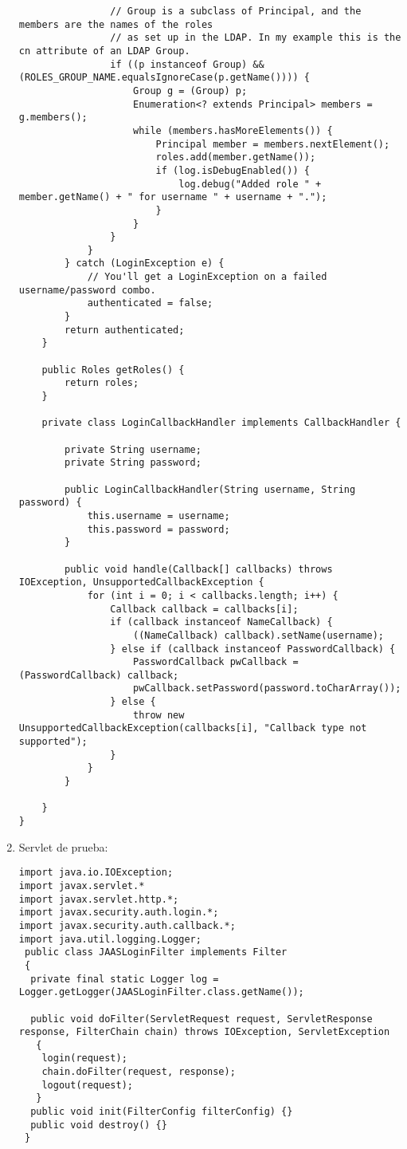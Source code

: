 \begin{enumerate}
\begin{lstlisting}
				// Group is a subclass of Principal, and the members are the names of the roles
				// as set up in the LDAP. In my example this is the cn attribute of an LDAP Group.
				if ((p instanceof Group) && (ROLES_GROUP_NAME.equalsIgnoreCase(p.getName()))) {
					Group g = (Group) p;
					Enumeration<? extends Principal> members = g.members();
					while (members.hasMoreElements()) {
						Principal member = members.nextElement();
						roles.add(member.getName());
						if (log.isDebugEnabled()) {
							log.debug("Added role " + member.getName() + " for username " + username + ".");
						}
					}
				}
			}
		} catch (LoginException e) {
			// You'll get a LoginException on a failed username/password combo.
			authenticated = false;
		}
        return authenticated;
    }

    public Roles getRoles() {
        return roles;
    }

    private class LoginCallbackHandler implements CallbackHandler {

    	private String username;
    	private String password;
    	
    	public LoginCallbackHandler(String username, String password) {
    		this.username = username;
    		this.password = password;
    	}
    	
		public void handle(Callback[] callbacks) throws IOException, UnsupportedCallbackException {
	    	for (int i = 0; i < callbacks.length; i++) {
				Callback callback = callbacks[i];
				if (callback instanceof NameCallback) {
					((NameCallback) callback).setName(username);
				} else if (callback instanceof PasswordCallback) {
					PasswordCallback pwCallback = (PasswordCallback) callback;
					pwCallback.setPassword(password.toCharArray());
				} else {
					throw new UnsupportedCallbackException(callbacks[i], "Callback type not supported");
				}
			}
		}
    	
    }
}
\end{lstlisting}
		\item Servlet de prueba:
\begin{lstlisting}
import java.io.IOException;
import javax.servlet.*
import javax.servlet.http.*;
import javax.security.auth.login.*;
import javax.security.auth.callback.*;
import java.util.logging.Logger;
 public class JAASLoginFilter implements Filter
 {
  private final static Logger log = Logger.getLogger(JAASLoginFilter.class.getName());
   
  public void doFilter(ServletRequest request, ServletResponse response, FilterChain chain) throws IOException, ServletException
   {
    login(request);
    chain.doFilter(request, response);
    logout(request);
   }
  public void init(FilterConfig filterConfig) {}
  public void destroy() {}
 }
 

\end{lstlisting}
\end{enumerate}
